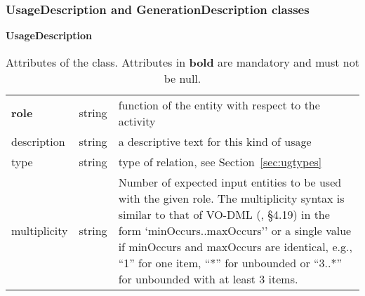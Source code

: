 \subsubsection{UsageDescription and GenerationDescription classes}
\label{sec:use_gen_desc}

\begin{table}[ht]
\small
{}\textwidth
\textbf{\normalsize UsageDescription}\vspace{0.25em}\\
\begin{tabulary}{1.0\textwidth}{llL}
\toprule
{} &   & \\
\midrule
\textbf{role} & string   & function of the entity with respect to the activity \\
description  & string & a descriptive text for this kind of usage \\
type    & string   & type of relation, see Section~\ref{sec:ugtypes} \\
multiplicity & string & Number of expected input entities to be used with the given role. The multiplicity syntax is similar to that of VO-DML (\citealt{2018ivoa.spec.0910L}, \S4.19) in the form `minOccurs..maxOccurs'' or a single value if minOccurs and maxOccurs are identical, e.g., ``1'' for one item, ``*'' for unbounded or ``3..*'' for unbounded with at least 3 items. \\
\bottomrule
\end{tabulary}
\caption[Attributes of the  class]{Attributes of the  class. Attributes in \textbf{bold} are mandatory and must not be null.}
\label{tab:usagedescription}
\end{table}


